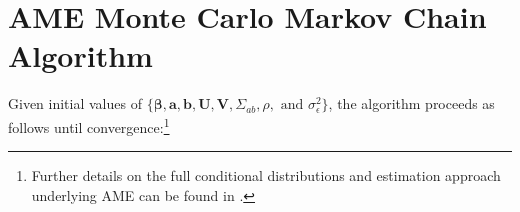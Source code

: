 \documentclass[12pt]{amsart}
\begin{document}
\appendix

\clearpage

\renewcommand{\thefigure}{\arabic{figure}}
\setcounter{figure}{0}
\renewcommand{\thetable}{\thesection \arabic{table}}
\setcounter{table}{0}
\setcounter{section}{0}

\appendix
\section{AME Monte Carlo Markov Chain Algorithm}

Given initial values of $\{\bm\beta, \mathbf{a}, \mathbf{b}, \mathbf{U}, \mathbf{V}, \Sigma_{ab}, \rho, \text{ and } \sigma_{\epsilon}^{2}\}$, the algorithm proceeds as follows until convergence:\footnote{Further details on the full conditional distributions and estimation approach underlying AME can be found in \citet{hoff:2021}.}
\end{document}
